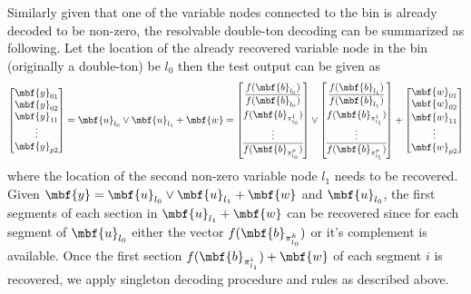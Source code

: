 \documentclass[conference,twocolumn]{IEEEtran}
\begin{document}
Similarly given that one of the variable nodes connected to the bin is already decoded to be non-zero, the resolvable double-ton decoding can be summarized as following. Let the location of the already recovered variable node in the bin (originally a double-ton) be $l_0$ then the test output can be given as 
\begin{align*}
\begin{bmatrix}
\mbf{y}_{01}\\
\mbf{y}_{02}\\
\mbf{y}_{11}\\
\vdots \\
\mbf{y}_{p2}\\
\end{bmatrix}
=\mbf{u}_{l_0} \vee \mbf{u}_{l_1}+\mbf{w}=
\begin{bmatrix}
f(\mbf{b}_{l_0})\\
\vspace{2pt}
\overline{f(\mbf{b}_{l_0})}\\
f(\mbf{b}_{\pi^1_{l_0}})\\
\vdots \\
\overline{f(\mbf{b}_{\pi^p_{l_0}})}\\
\end{bmatrix} 
\vee
\begin{bmatrix}
f(\mbf{b}_{l_1})\\
\vspace{2pt}
\overline{f(\mbf{b}_{l_1})}\\
f(\mbf{b}_{\pi^1_{l_1}})\\
\vdots \\
\overline{f(\mbf{b}_{\pi^p_{l_1}})}\\
\end{bmatrix}+
\begin{bmatrix}
\mbf{w}_{01}\\
\vspace{2pt}
\mbf{w}_{02}\\
\mbf{w}_{11}\\
\vdots \\
\mbf{w}_{p2}\\
\end{bmatrix}
\end{align*} 
where the location of the second non-zero variable node $l_1$ needs to be recovered. Given $\mbf{y}=\mbf{u}_{l_0} \vee \mbf{u}_{l_1}+\mbf{w}$ and $\mbf{u}_{l_0}$, the first segments of each section in $\mbf{u}_{l_1}+\mbf{w}$ can be recovered since for each segment of $\mbf{u}_{l_0}$ either the vector $f(\mbf{b}_{\pi^k_{l_0}})$ or it's complement is available. Once the first section $f(\mbf{b}_{\pi_{l_1}^i})+\mbf{w}$ of each segment $i$ is recovered, we apply singleton decoding procedure and rules as described above.
\end{document}
